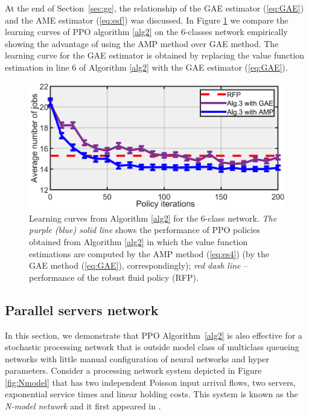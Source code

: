 \documentclass[11pt]{article}
\theoremstyle{definition}
\numberwithin{equation}{section}
\begin{document}
At the end of Section~\ref{sec:ge}, the relationship of the
GAE estimator (\ref{eq:GAE}) and the AME estimator (\ref{eq:esf}) was discussed.
In Figure \ref{fig:AMPvsGAE} we compare the learning curves of PPO algorithm \ref{alg2} on the 6-classes network  empirically showing the advantage of using the AMP method over GAE method.
The learning curve for the GAE estimator is obtained by replacing the value function estimation in line 6 of Algorithm \ref{alg2} with the  GAE estimator (\ref{eq:GAE}).






\begin{figure}[H]
\centering%
\includegraphics[width=.5\linewidth]{AMPvsGAE}
\caption[]{Learning curves from Algorithm \ref{alg2} for the 6-class network.  \textit{The purple (blue) solid line} shows the performance of  PPO policies obtained from Algorithm \ref{alg2} in which
the value function estimations are computed by the AMP method (\ref{eq:es4})
 (by the GAE method (\ref{eq:GAE}), correspondingly);     \textit{red dash line} --performance of the robust fluid policy (RFP).}
\label{fig:AMPvsGAE}%
\end{figure}



\subsection{Parallel servers network}\label{sec:nmodel}
In this section, we  demonstrate that PPO Algorithm~\ref{alg2} is also effective for a stochastic processing network that is outside model class of multiclass queueing networks with little  manual configuration of neural networks and hyper parameters.
Consider a  processing network system depicted in  Figure \ref{fig:Nmodel} that has two independent Poisson input arrival flows, two servers, exponential
service times and linear holding costs. This system is known as the \textit{N-model network} and it first appeared in \cite{Harrison1998}.
\end{document}
